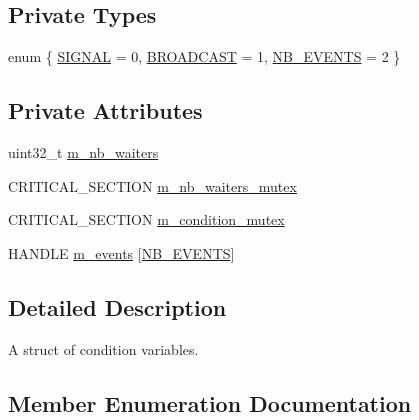 \subsection*{Private Types}
\begin{DoxyCompactItemize}
\item 
enum \{ \hyperlink{structmage_1_1_condition_variable_a18acb6d59c39a7bf9ee86939f4635000a83361ddf52d1973875f7a48ac4bccf94}{S\+I\+G\+N\+AL} = 0, 
\hyperlink{structmage_1_1_condition_variable_a18acb6d59c39a7bf9ee86939f4635000a5863233d3c1e62ca806753b0d175199f}{B\+R\+O\+A\+D\+C\+A\+ST} = 1, 
\hyperlink{structmage_1_1_condition_variable_a18acb6d59c39a7bf9ee86939f4635000abc7182486d437f413ac9c77ae0bfdac1}{N\+B\+\_\+\+E\+V\+E\+N\+TS} = 2
 \}
\end{DoxyCompactItemize}
\subsection*{Private Attributes}
\begin{DoxyCompactItemize}
\item 
uint32\+\_\+t \hyperlink{structmage_1_1_condition_variable_ac02cb14000a597ec91b8546bdcbb9dd1}{m\+\_\+nb\+\_\+waiters}
\item 
C\+R\+I\+T\+I\+C\+A\+L\+\_\+\+S\+E\+C\+T\+I\+ON \hyperlink{structmage_1_1_condition_variable_a0686e682d62d44ff1eb9ac45acbb0eab}{m\+\_\+nb\+\_\+waiters\+\_\+mutex}
\item 
C\+R\+I\+T\+I\+C\+A\+L\+\_\+\+S\+E\+C\+T\+I\+ON \hyperlink{structmage_1_1_condition_variable_ab5ff870b2881a1979ccaec986d762441}{m\+\_\+condition\+\_\+mutex}
\item 
H\+A\+N\+D\+LE \hyperlink{structmage_1_1_condition_variable_ac61c3440af244ec43d2ad53026ec9de4}{m\+\_\+events} \mbox{[}\hyperlink{structmage_1_1_condition_variable_a18acb6d59c39a7bf9ee86939f4635000abc7182486d437f413ac9c77ae0bfdac1}{N\+B\+\_\+\+E\+V\+E\+N\+TS}\mbox{]}
\end{DoxyCompactItemize}


\subsection{Detailed Description}
A struct of condition variables. 

\subsection{Member Enumeration Documentation}
\hypertarget{structmage_1_1_condition_variable_a18acb6d59c39a7bf9ee86939f4635000}{}\label{structmage_1_1_condition_variable_a18acb6d59c39a7bf9ee86939f4635000} 
